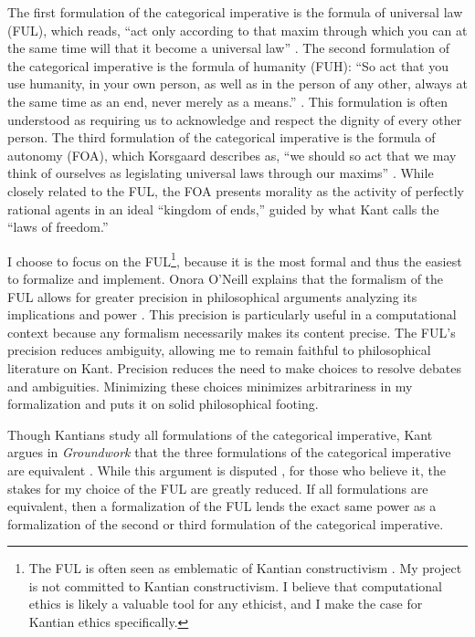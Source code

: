 \begin{isabellebody}
\begin{isamarkuptext}
The first formulation of the categorical imperative is the
formula of universal law (FUL), which reads, ``act only according to that maxim through which you can 
at the same time will that it become a universal law'' \citep[34]{groundwork}. The 
second formulation of the categorical imperative is the formula of humanity (FUH): ``So act that you use humanity, 
in your own person, as well as in the person of any other, always at the same time as an end, never merely 
as a means.'' \cite[41]{groundwork}. This formulation is often understood as requiring us to 
acknowledge and respect the dignity of every other person. The third formulation of the categorical 
imperative is the formula of autonomy (FOA), which Korsgaard describes
as, ``we should so act that we may think of ourselves as legislating universal laws through our 
maxims'' \cite[28]{korsgaardintro}. While closely related to the FUL, the FOA presents morality as the activity of 
perfectly rational agents in an ideal ``kingdom of ends,'' guided by what Kant calls the ``laws of freedom.''

I choose to focus on the FUL\footnote{The FUL is often seen as emblematic of Kantian constructivism \cite[173]{ebelsduggan}. 
My project is not committed to Kantian constructivism. I believe that computational ethics is likely a 
valuable tool for any ethicist, and I make the case for Kantian ethics specifically.},
 because it is the most formal and thus the easiest to formalize and implement. 
Onora O'Neill explains that the formalism of the FUL allows 
for greater precision in philosophical arguments analyzing its implications and power \cite[33]{actingonprinciple}. This precision 
is particularly useful in a computational context because any formalism necessarily makes its content 
precise. The FUL's precision reduces ambiguity, allowing me to remain faithful to philosophical
literature on Kant. Precision reduces the need to make choices to resolve debates 
and ambiguities. Minimizing these choices minimizes 
arbitrariness in my formalization and puts it on solid philosophical footing.

Though Kantians study all formulations of the categorical imperative, Kant argues in \emph{Groundwork} 
that the three formulations of the categorical imperative are equivalent \citep{groundwork}. While this 
argument is disputed \cite{sepkant}, for those who believe it, the
stakes for my choice of the FUL are greatly reduced. If all formulations are equivalent, then a formalization of the FUL
lends the exact same power as a formalization of the second or third formulation of the categorical 
imperative. 


\end{isamarkuptext}
\end{isabellebody}
